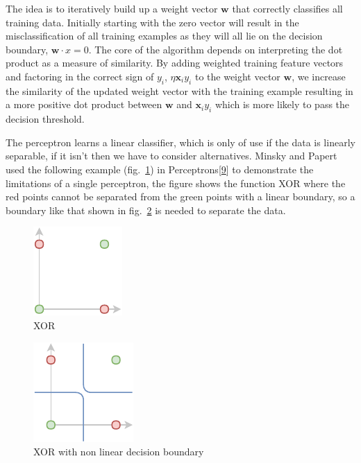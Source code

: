 \documentclass[A4paper,draft]{scrreprt}
\begin{document}
The idea is to iteratively build up a weight vector \(\bm{w}\) that
correctly classifies all training data. Initially starting with the zero
vector will result in the misclassification of all training examples as
they will all lie on the decision boundary, \(\bm{w} \cdot x = 0\). The
core of the algorithm depends on interpreting the dot product as a
measure of similarity. By adding weighted training feature vectors and
factoring in the correct sign of \(y_i\), \(\eta \bm{x}_i y_i\) to the
weight vector \(\bm{w}\), we increase the similarity of the updated
weight vector with the training example resulting in a more positive dot
product between \(\bm{w}\) and \(\bm{x}_i y_i\) which is more likely to
pass the decision threshold.

The perceptron learns a linear classifier, which is only of use if the
data is linearly separable, if it isn't then we have to consider
alternatives. Minsky and Papert used the following example
(fig.~\ref{fig:xor}) in
Perceptrons{[}\protect\hyperlink{ref-minsky1969_Perceptrons}{9}{]} to
demonstrate the limitations of a single perceptron, the figure shows the
function XOR where the red points cannot be separated from the green
points with a linear boundary, so a boundary like that shown in
fig.~\ref{fig:xor-non-linear-decision-boundary} is needed to separate
the data.

\begin{figure}
\centering
\includegraphics{media/images/xor.pdf}
\caption{XOR}\label{fig:xor}
\end{figure}

\begin{figure}
\centering
\includegraphics{media/images/xor-boundaries.pdf}
\caption{XOR with non linear decision
boundary}\label{fig:xor-non-linear-decision-boundary}
\end{figure}
\end{document}
